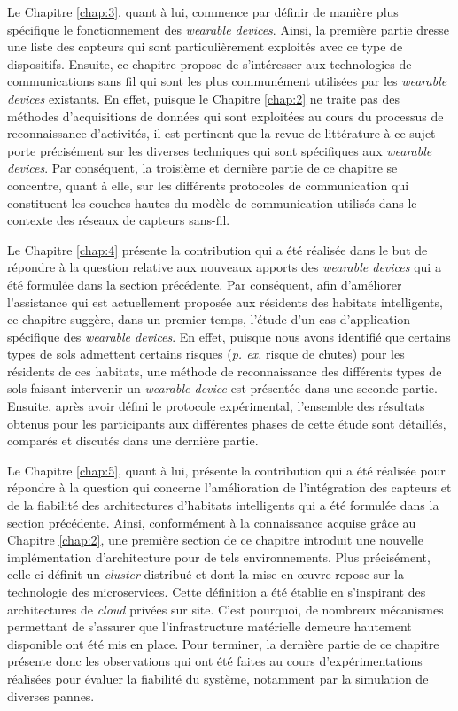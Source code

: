 {{Le Chapitre \ref{chap:3}, quant à lui, commence par définir de manière plus spécifique le fonctionnement des \textit{wearable devices}. Ainsi, la première partie dresse une liste des capteurs qui sont particulièrement exploités avec ce type de dispositifs. Ensuite, ce chapitre propose de s'intéresser aux technologies de communications sans fil qui sont les plus communément utilisées par les \textit{wearable devices} existants. En effet, puisque le Chapitre \ref{chap:2} ne traite pas des méthodes d'acquisitions de données qui sont exploitées au cours du processus de reconnaissance d'activités, il est pertinent que la revue de littérature à ce sujet porte précisément sur les diverses techniques qui sont spécifiques aux \textit{wearable devices}. Par conséquent, la troisième et dernière partie de ce chapitre se concentre, quant à elle, sur les différents protocoles de communication qui constituent les couches hautes du modèle de communication utilisés dans le contexte des réseaux de capteurs sans-fil.

Le Chapitre \ref{chap:4} présente la contribution qui a été réalisée dans le but de répondre à la question relative aux nouveaux apports des \textit{wearable devices} qui a été formulée dans la section précédente. Par conséquent, afin d'améliorer l'assistance qui est actuellement proposée aux résidents des habitats intelligents, ce chapitre suggère, dans un premier temps, l'étude d'un cas d'application spécifique des \textit{wearable devices}. En effet, puisque nous avons identifié que certains types de sols admettent certains risques (\textit{p. ex.} risque de chutes) pour les résidents de ces habitats, une méthode de reconnaissance des différents types de sols faisant intervenir un \textit{wearable device} est présentée dans une seconde partie. Ensuite, après avoir défini le protocole expérimental, l'ensemble des résultats obtenus pour les participants aux différentes phases de cette étude sont détaillés, comparés et discutés dans une dernière partie.

Le Chapitre \ref{chap:5}, quant à lui, présente la contribution qui a été réalisée pour répondre à la question qui concerne l'amélioration de l'intégration des capteurs et de la fiabilité des architectures d'habitats intelligents qui a été formulée dans la section précédente. Ainsi, conformément à la connaissance acquise grâce au Chapitre \ref{chap:2}, une première section de ce chapitre introduit une nouvelle implémentation d'architecture pour de tels environnements. Plus précisément, celle-ci définit un \textit{cluster} distribué et dont la mise en \oe{}uvre repose sur la technologie des microservices. Cette définition a été établie en s'inspirant des architectures de \textit{cloud} privées sur site. C'est pourquoi, de nombreux mécanismes permettant de s'assurer que l'infrastructure matérielle demeure hautement disponible ont été mis en place. Pour terminer, la dernière partie de ce chapitre présente donc les observations qui ont été faites au cours d'expérimentations réalisées pour évaluer la fiabilité du système, notamment par la simulation de diverses pannes.

}}
